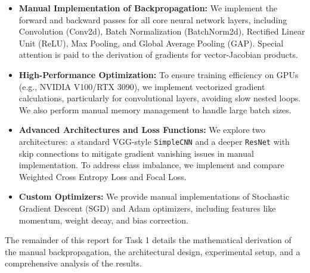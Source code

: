 \begin{itemize}
    \item \textbf{Manual Implementation of Backpropagation:} We implement the forward and backward passes for all core neural network layers, including Convolution (Conv2d), Batch Normalization (BatchNorm2d), Rectified Linear Unit (ReLU), Max Pooling, and Global Average Pooling (GAP). Special attention is paid to the derivation of gradients for vector-Jacobian products.
    \item \textbf{High-Performance Optimization:} To ensure training efficiency on GPUs (e.g., NVIDIA V100/RTX 3090), we implement vectorized gradient calculations, particularly for convolutional layers, avoiding slow nested loops. We also perform manual memory management to handle large batch sizes.
    \item \textbf{Advanced Architectures and Loss Functions:} We explore two architectures: a standard VGG-style \texttt{SimpleCNN} and a deeper \texttt{ResNet} with skip connections to mitigate gradient vanishing issues in manual implementation. To address class imbalance, we implement and compare Weighted Cross Entropy Loss and Focal Loss.
    \item \textbf{Custom Optimizers:} We provide manual implementations of Stochastic Gradient Descent (SGD) and Adam optimizers, including features like momentum, weight decay, and bias correction.
\end{itemize}

The remainder of this report for Task 1 details the mathematical derivation of the manual backpropagation, the architectural design, experimental setup, and a comprehensive analysis of the results.
